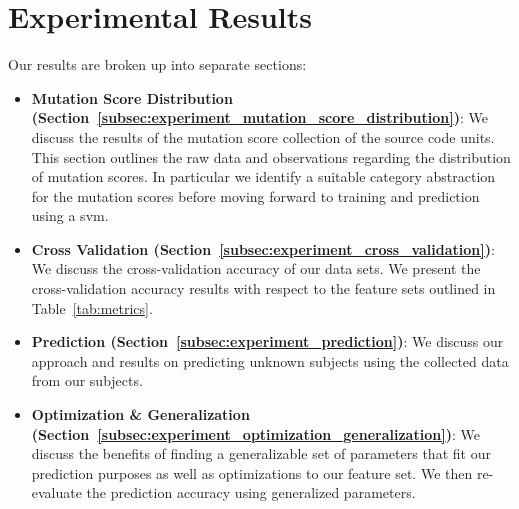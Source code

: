 \section{Experimental Results}
\label{sec:experiment_results}
Our results are broken up into separate sections:

\begin{itemize}
  \item \textbf{Mutation Score Distribution (Section~\ref{subsec:experiment_mutation_score_distribution})}: We discuss the results of the mutation score collection of the source code units. This section outlines the raw data and observations regarding the distribution of mutation scores. In particular we identify a suitable category abstraction for the mutation scores before moving forward to training and prediction using a \gls{svm}.
  \item \textbf{Cross Validation (Section~\ref{subsec:experiment_cross_validation})}: We discuss the cross-validation accuracy of our data sets. We present the cross-validation accuracy results with respect to the feature sets outlined in Table~\ref{tab:metrics}.
  \item \textbf{Prediction (Section~\ref{subsec:experiment_prediction})}: We discuss our approach and results on predicting unknown subjects using the collected data from our subjects.
  \item \textbf{Optimization \& Generalization (Section~\ref{subsec:experiment_optimization_generalization})}: We discuss the benefits of finding a generalizable set of parameters that fit our prediction purposes as well as optimizations to our feature set. We then re-evaluate the prediction accuracy using generalized parameters.
\end{itemize}


